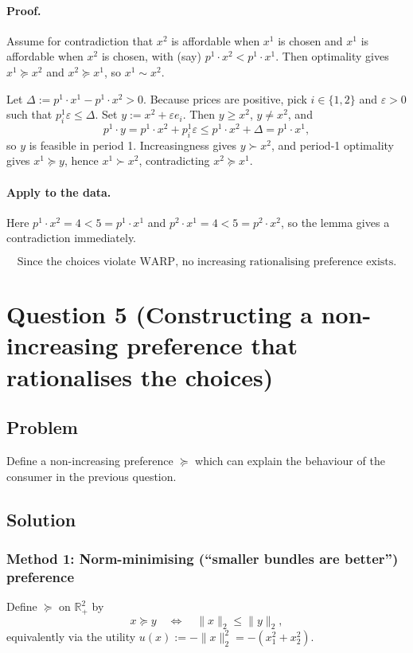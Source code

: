 \documentclass[12pt]{article}
\begin{document}
\paragraph{Proof.}
Assume for contradiction that \(x^2\) is affordable when \(x^1\) is chosen and \(x^1\) is affordable when \(x^2\) is chosen, with (say) \(p^1\cdot x^2 < p^1\cdot x^1\).
Then optimality gives \(x^1\succeq x^2\) and \(x^2\succeq x^1\), so \(x^1\sim x^2\).

Let \(\Delta := p^1\cdot x^1 - p^1\cdot x^2>0\).
Because prices are positive, pick \(i\in\{1,2\}\) and \(\varepsilon>0\) such that \(p^1_i\varepsilon\le \Delta\).
Set \(y:=x^2+\varepsilon e_i\). Then \(y\ge x^2\), \(y\neq x^2\), and
\[
p^1\cdot y = p^1\cdot x^2 + p^1_i\varepsilon \le p^1\cdot x^2 + \Delta = p^1\cdot x^1,
\]
so \(y\) is feasible in period 1. Increasingness gives \(y\succ x^2\), and period-1 optimality gives \(x^1\succeq y\), hence \(x^1\succ x^2\), contradicting \(x^2\succeq x^1\).

\paragraph{Apply to the data.}
Here \(p^1\cdot x^2=4<5=p^1\cdot x^1\) and \(p^2\cdot x^1=4<5=p^2\cdot x^2\), so the lemma gives a contradiction immediately.

\[
\boxed{\text{Since the choices violate WARP, no increasing rationalising preference exists.}}
\]

\newpage
\section*{Question 5 (Constructing a non-increasing preference that rationalises the choices)}
\subsection*{Problem}
Define a non-increasing preference \(\succeq\) which can explain the behaviour of the consumer in the previous question.

\subsection*{Solution}

\subsubsection*{Method 1: Norm-minimising (``smaller bundles are better'') preference}
Define \(\succeq\) on \(\mathbb{R}^2_+\) by
\[
x\succeq y \quad\Longleftrightarrow\quad \|x\|_2 \le \|y\|_2,
\]
equivalently via the utility \(u(x):=-\|x\|_2^2=-(x_1^2+x_2^2)\).
\end{document}
